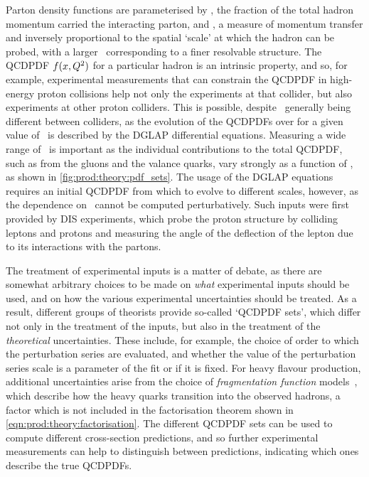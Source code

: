Parton density functions are parameterised by \bjorkenx, the fraction of the 
total hadron momentum carried the interacting parton, and \pdfqsquared, a 
measure of momentum transfer and inversely proportional to the spatial `scale' 
at which the hadron can be probed, with a larger \pdfqsquared\ corresponding to 
a finer resolvable structure.
The \ac{QCDPDF} $f(x, Q^{2})$ for a particular hadron is an 
intrinsic property, and so, for example, experimental measurements that can 
constrain the \ac{QCDPDF} in high-energy proton collisions help not only the 
experiments at that collider, but also experiments at other proton colliders.
This is possible, despite \pdfqsquared\ generally being different between 
colliders, as the evolution of the \acp{QCDPDF} over \pdfqsquared for a given 
value of \bjorkenx\ is described by the \ac{DGLAP} differential equations.
Measuring a wide range of \bjorkenx\ is important as the individual 
contributions to the total \ac{QCDPDF}, such as from the gluons and the valance 
quarks, vary strongly as a function of \bjorkenx, as shown in 
\cref{fig:prod:theory:pdf_sets}.
The usage of the \ac{DGLAP} equations requires an initial \ac{QCDPDF} from 
which to evolve to different scales, however, as the dependence on \bjorkenx\ 
cannot be computed perturbatively.
Such inputs were first provided by \ac{DIS} experiments, which probe the proton 
structure by colliding leptons and protons and measuring the angle of the 
deflection of the lepton due to its interactions with the partons.

The treatment of experimental inputs is a matter of debate, as there are 
somewhat arbitrary choices to be made on \emph{what} experimental inputs should 
be used, and on how the various experimental uncertainties should be 
treated.
As a result, different groups of theorists provide so-called `\ac{QCDPDF} 
sets', which differ not only in the treatment of the inputs, but also in the 
treatment of the \emph{theoretical} uncertainties.
These include, for example, the choice of order to which the perturbation 
series are evaluated, and whether the value of the perturbation series scale is 
a parameter of the fit or if it is fixed.
For heavy flavour production, additional uncertainties arise from the choice of 
\emph{fragmentation function} models~\cite{Kneesch:2007ey}, which describe how 
the heavy quarks transition into the observed hadrons, a factor which is not 
included in the factorisation theorem shown in 
\cref{eqn:prod:theory:factorisation}.\footnotemark
The different \ac{QCDPDF} sets can be used to compute different cross-section 
predictions, and so further experimental measurements can help to distinguish 
between predictions, indicating which ones describe the true \acp{QCDPDF}.

